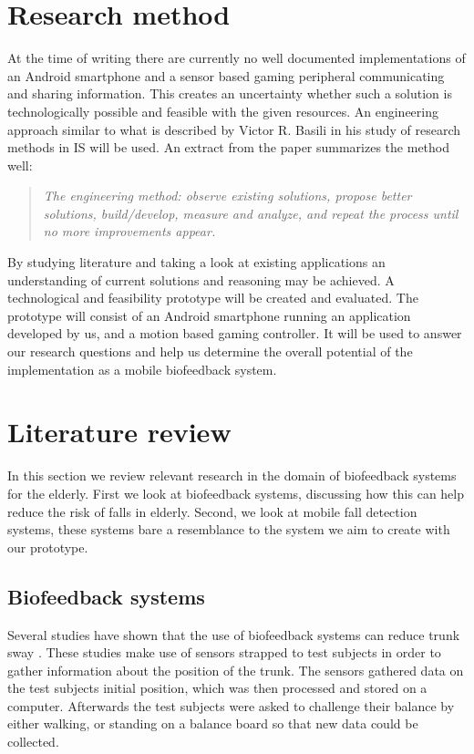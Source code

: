\section{Research method}
At the time of writing there are currently no well documented implementations of an Android smartphone and a sensor based gaming peripheral communicating and sharing information. This creates an uncertainty whether such a solution is technologically possible and feasible with the given resources. An engineering approach similar to what is described by Victor R. Basili\cite{paradigm} in his study of research methods in IS will be used. An extract from the paper summarizes the method well:

\begin{quote}
\textit{The engineering method: observe existing solutions, propose better solutions, build/develop, measure and analyze, and repeat the process until no more improvements appear.}

\end{quote}
By studying literature and taking a look at existing applications an understanding of current solutions and reasoning may be achieved. A technological and feasibility prototype will be created and evaluated. The prototype will consist of an Android smartphone running an application developed by us, and a motion based gaming controller. It will be used to answer our research questions and help us determine the overall potential of the implementation as a mobile biofeedback system.

\section{Literature review}
In this section we review relevant research in the domain of biofeedback systems for the elderly. First we look at biofeedback systems, discussing how this can help reduce the risk of falls in elderly. Second, we look at mobile fall detection systems, these systems bare a resemblance to the system we aim to create with our prototype.

\subsection{Biofeedback systems}
Several studies have shown that the use of biofeedback systems can reduce trunk sway \cite{multiModualBiofeedback, vibrotactileBiofeedback, vibrotactileTiltFeedback}. These studies make use of sensors strapped to test subjects in order to gather information about the position of the trunk. The sensors gathered data on the test subjects initial position, which was then processed and stored on a computer. Afterwards the test subjects were asked to challenge their balance by either walking, or standing on a balance board so that new data could be collected.

